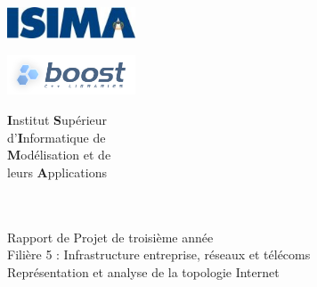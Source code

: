 \begin{titlepage}
	\begin{minipage}{0.5\textwidth}
		\begin{flushleft} \large
			\includegraphics[width=3.8cm]{./schema/logo-isima.jpg}\\
		\end{flushleft}
	\end{minipage}
	\begin{minipage}{0.43\textwidth}
		\begin{flushright} \large
			\includegraphics[width=3.8cm]{schema/logo-boost.png}
		\end{flushright}
	\end{minipage}

	\begin{minipage}{0.5\textwidth}
		\begin{flushleft} \large
			\textbf{I}nstitut \textbf{S}upérieur\\
			d'\textbf{I}nformatique de\\
			\textbf{M}odélisation et de\\
			leurs \textbf{A}pplications\\
			~\\
		\end{flushleft}
	\end{minipage}
	\begin{minipage}{0.43\textwidth}
		\begin{flushright} \large
		\end{flushright}
	\end{minipage}


		\vfill
		\begin{center}
			\Hrule \\[0.4cm]
			\Large{Rapport de Projet de troisième année}\\		
			\Large Filière 5 : Infrastructure entreprise, réseaux et télécoms\\[1.0cm]
			\Huge{Représentation et analyse de la topologie Internet}\\
			\Hrule\\[0.8cm]
\vfill 
		\end{center}
		

\end{titlepage}
